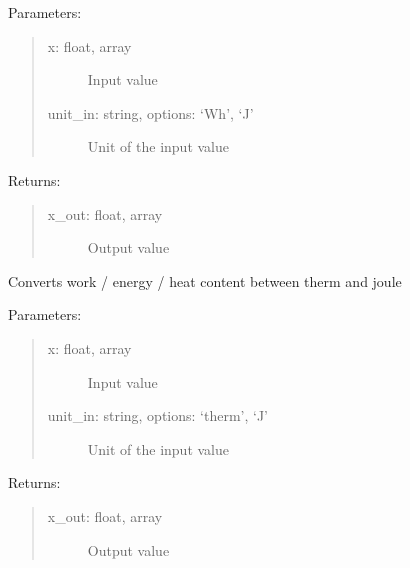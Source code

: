 \documentclass[letterpaper,10pt,english,openany]{sphinxmanual}
\begin{document}
\begin{fulllineitems}
\begin{fulllineitems}
Parameters:
\begin{quote}
\begin{description}
\item[{x: float, array}] \leavevmode
Input value

\item[{unit\_in: string, options: ‘Wh’, ‘J’}] \leavevmode
Unit of the input value

\end{description}
\end{quote}

Returns:
\begin{quote}
\begin{description}
\item[{x\_out: float, array}] \leavevmode
Output value

\end{description}
\end{quote}

\end{fulllineitems}


\begin{fulllineitems}
\label{\detokenize{source/mswh.tools:mswh.tools.unit_converters.UnitConv.therm_J}}
Converts work / energy / heat content between therm and joule

Parameters:
\begin{quote}
\begin{description}
\item[{x: float, array}] \leavevmode
Input value

\item[{unit\_in: string, options: ‘therm’, ‘J’}] \leavevmode
Unit of the input value

\end{description}
\end{quote}

Returns:
\begin{quote}
\begin{description}
\item[{x\_out: float, array}] \leavevmode
Output value

\end{description}
\end{quote}

\end{fulllineitems}


\end{fulllineitems}
\end{document}
